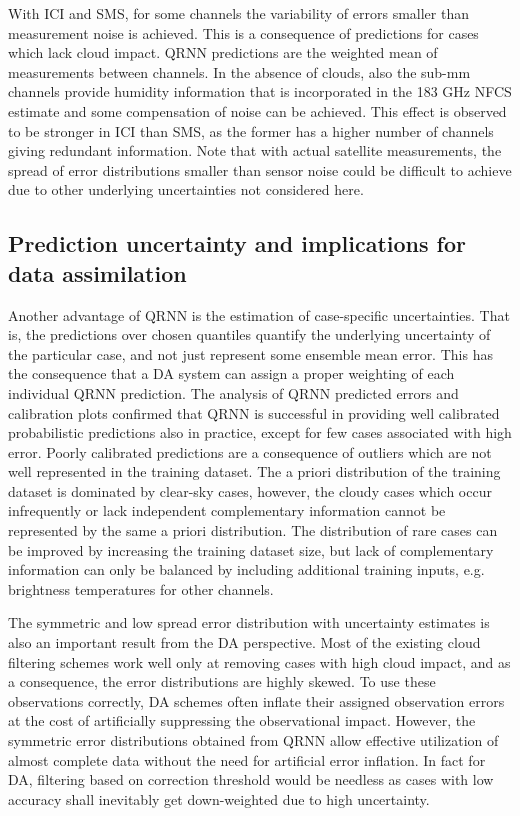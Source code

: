 \documentclass[amt, manuscript]{copernicus}
\begin{document}
With ICI and SMS, for some channels the variability of errors smaller than measurement noise is achieved. This is a consequence of predictions for cases which lack cloud impact. QRNN predictions are the weighted mean of measurements between channels. In the absence of clouds, also the sub-mm channels provide humidity information that is incorporated in the 183 GHz NFCS estimate and some compensation of noise can be achieved. This effect is observed to be stronger in ICI than SMS, as the former has a higher number of channels giving redundant information. Note that with actual satellite measurements, the spread of error distributions smaller than sensor noise could be difficult to achieve due to other underlying uncertainties not considered here. 
 


\subsection{Prediction uncertainty and implications for data assimilation}

Another advantage of QRNN is the estimation of case-specific uncertainties. That is, the predictions over chosen quantiles quantify the underlying uncertainty of the particular case, and not just represent some ensemble mean error. This has the consequence that a DA system can assign a proper weighting of each individual QRNN prediction. The analysis of QRNN predicted errors and calibration plots confirmed that QRNN is successful in providing well calibrated probabilistic predictions also in practice, except for few cases associated with high error. Poorly calibrated predictions are a consequence of outliers which are not well represented in the training dataset. The a priori distribution of the training dataset is dominated by clear-sky cases, however, the cloudy cases which occur infrequently or lack independent complementary information cannot be represented by the same a priori distribution. The distribution of rare cases can be improved by increasing the training dataset size, but lack of complementary information can only be balanced by including additional training inputs, e.g. brightness temperatures for other channels. 

The symmetric and low spread error distribution with uncertainty estimates is also an important result from the DA perspective. Most of the existing cloud filtering schemes work well only at removing cases with high cloud impact, and as a consequence, the error distributions are highly skewed. To use these observations correctly, DA schemes often inflate their assigned observation errors at the cost of artificially suppressing the observational impact. However, the symmetric error distributions obtained from QRNN allow effective utilization of almost complete data without the need for artificial error inflation. In fact for DA, filtering based on correction threshold would be needless as cases with low accuracy shall inevitably get down-weighted due to high uncertainty.   
\end{document}
